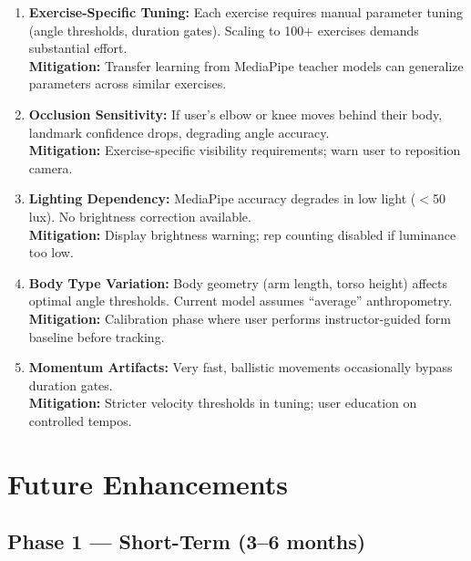 \documentclass[12pt,a4paper]{article}
\begin{document}
\begin{enumerate}[noitemsep, topsep=2pt]
  \item \textbf{Exercise-Specific Tuning:} Each exercise requires manual 
        parameter tuning (angle thresholds, duration gates). Scaling to 100+ 
        exercises demands substantial effort.\\
        \textbf{Mitigation:} Transfer learning from MediaPipe teacher models 
        can generalize parameters across similar exercises.
  
  \item \textbf{Occlusion Sensitivity:} If user's elbow or knee moves behind 
        their body, landmark confidence drops, degrading angle accuracy.\\
        \textbf{Mitigation:} Exercise-specific visibility requirements; warn 
        user to reposition camera.
  
  \item \textbf{Lighting Dependency:} MediaPipe accuracy degrades in low light 
        ($<$50 lux). No brightness correction available.\\
        \textbf{Mitigation:} Display brightness warning; rep counting disabled 
        if luminance too low.
  
  \item \textbf{Body Type Variation:} Body geometry (arm length, torso height) 
        affects optimal angle thresholds. Current model assumes ``average'' 
        anthropometry.\\
        \textbf{Mitigation:} Calibration phase where user performs 
        instructor-guided form baseline before tracking.
  
  \item \textbf{Momentum Artifacts:} Very fast, ballistic movements occasionally 
        bypass duration gates.\\
        \textbf{Mitigation:} Stricter velocity thresholds in tuning; user 
        education on controlled tempos.
\end{enumerate}

\section{Future Enhancements}

\subsection{Phase 1 --- Short-Term (3--6 months)}
\end{document}
